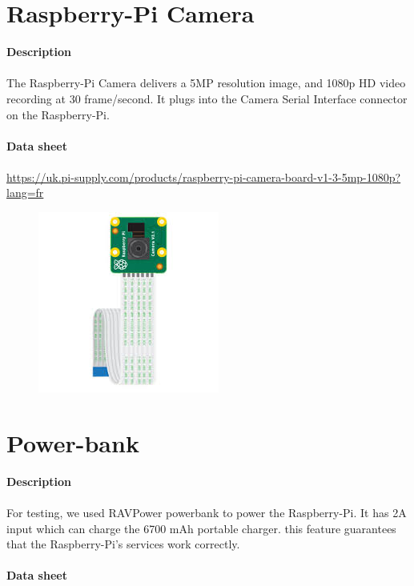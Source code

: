 \documentclass[12pt]{report}
\begin{document}
	\section{Raspberry-Pi Camera}
	\textbf{Description}
	\paragraph{}
	The Raspberry-Pi Camera delivers a 5MP resolution image, and 1080p HD video recording at 30 frame/second. It plugs into the Camera Serial Interface connector on the Raspberry-Pi. \\ \\
	\textbf{Data sheet} 
	\paragraph{}
	\url{https://uk.pi-supply.com/products/raspberry-pi-camera-board-v1-3-5mp-1080p?lang=fr}
	\begin{figure}[H]
		\begin{center}
			\includegraphics[scale=0.6]{res/camera.jpg}
		\end{center}
	\end{figure}
	\section{Power-bank}
	\textbf{Description}
	\paragraph{}
	For testing, we used RAVPower powerbank to power the Raspberry-Pi. It has 2A input which can charge the 6700 mAh portable charger. this feature guarantees that the Raspberry-Pi's services work correctly. \\ \\
	\textbf{Data sheet} 
\end{document}
